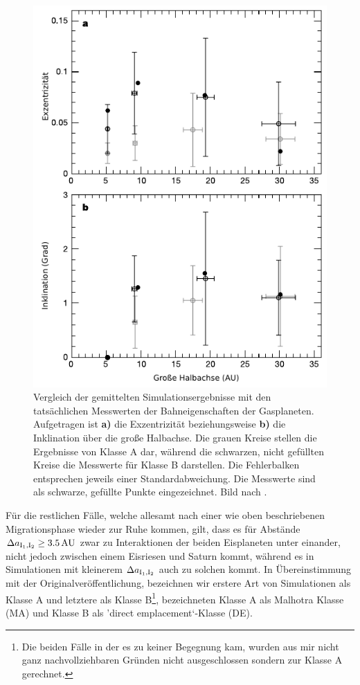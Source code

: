 \documentclass[12pt,a4paper,twoside]{article}
\renewcommand{\cite}{\citep}
\begin{document}
\begin{figure}[tbn]
\centering
\includegraphics[scale=1]{img/Tsiganis2005-2.pdf}
\caption{Vergleich der gemittelten Simulationsergebnisse mit den tatsächlichen Messwerten der Bahneigenschaften der Gasplaneten. Aufgetragen ist \textbf{a)} die Exzentrizität beziehungsweise \textbf{b)} die Inklination über die große Halbachse. Die grauen Kreise stellen die Ergebnisse von Klasse A dar, während die schwarzen, nicht gefüllten Kreise die Messwerte für Klasse B darstellen. Die Fehlerbalken entsprechen jeweils einer Standardabweichung. Die Messwerte sind als schwarze, gefüllte Punkte eingezeichnet. Bild nach \cite{Tsiganis2005}.}
\label{fig:VergleichmitMesswerten}
\end{figure}
Für die restlichen Fälle, welche allesamt nach einer wie oben beschriebenen Migrationsphase wieder zur Ruhe kommen, %
gilt, dass es für Abstände $\DII \ge \unit[3.5]{AU}$ zwar zu Interaktionen der beiden Eisplaneten unter einander, nicht jedoch zwischen einem Eisriesen und Saturn kommt, während es in Simulationen mit kleinerem $\Delta a_{\mathrm{I}_1,\mathrm{I}_2}$ auch zu solchen kommt. In Übereinstimmung mit der Originalveröffentlichung, bezeichnen wir erstere Art von Simulationen als Klasse A und letztere als Klasse B\footnote{Die beiden Fälle in der es zu keiner Begegnung kam, wurden aus mir nicht ganz nachvollziehbaren Gründen nicht ausgeschlossen sondern zur Klasse A gerechnet.}, \cite{Nesvorny2007} bezeichneten Klasse A als Malhotra Klasse (MA) und Klasse B als 'direct emplacement`-Klasse (DE). %
\end{document}
